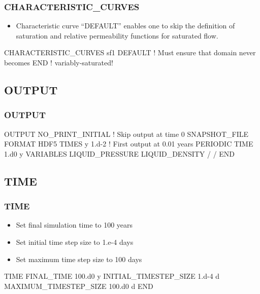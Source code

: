 \documentclass{beamer}
\newcommand\bluecomment[1]{{{\color{blue} #1}}}
\begin{document}
\begin{frame}[fragile]\frametitle{CHARACTERISTIC\_CURVES}
\begin{itemize}
\item Characteristic curve ``DEFAULT'' enables one to skip the definition of saturation and relative permeability functions for saturated flow.
\end{itemize}
\begin{semiverbatim}


CHARACTERISTIC_CURVES sf1
  DEFAULT  \bluecomment{! Must ensure that domain never becomes }
END        \bluecomment{!   variably-saturated!}
\end{semiverbatim}

\end{frame}

\subsection{OUTPUT}

\begin{frame}[fragile]\frametitle{OUTPUT}

\begin{semiverbatim}
  
OUTPUT
  NO_PRINT_INITIAL         \bluecomment{! Skip output at time 0}
  SNAPSHOT_FILE
    FORMAT HDF5 
    TIMES y 1.d-2          \bluecomment{! First output at 0.01 years}
    PERIODIC TIME 1.d0 y
    VARIABLES
      LIQUID_PRESSURE
      LIQUID_DENSITY
    /
  /
END
  
\end{semiverbatim}

\end{frame}

\subsection{TIME}

\begin{frame}[fragile]\frametitle{TIME}

\begin{itemize}
  \item Set final simulation time to 100 years
  \item Set initial time step size to 1.e-4 days
  \item Set maximum time step size to 100 days
\end{itemize}


\begin{semiverbatim}
TIME
  FINAL_TIME 100.d0 y
  INITIAL_TIMESTEP_SIZE 1.d-4 d
  MAXIMUM_TIMESTEP_SIZE 100.d0 d
END
\end{semiverbatim}

\end{frame}
\end{document}
